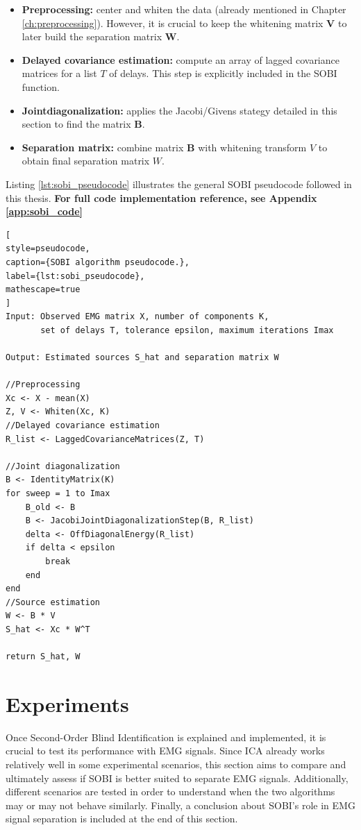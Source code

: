 \begin{itemize}
    \item \textbf{Preprocessing:} center and whiten the data (already mentioned in Chapter \ref{ch:preprocessing}). However, it is crucial to keep the whitening matrix $\mathbf{V}$ to later build the separation matrix $\mathbf{W}$.\item \textbf{Delayed covariance estimation:} compute an array of lagged covariance matrices for a list $T$ of delays. This step is explicitly included in the SOBI function.
    \item \textbf{Jointdiagonalization:} applies the Jacobi/Givens stategy detailed in this section to find the matrix $\mathbf{B}$.
    \item \textbf{Separation matrix:} combine matrix $\mathbf{B}$ with whitening transform $V$ to obtain final separation matrix $W$.
\end{itemize}

\noindent Listing \ref{lst:sobi_pseudocode} illustrates the general SOBI pseudocode followed in this thesis. \textbf{For full code implementation reference, see Appendix \ref{app:sobi_code}}

\begin{lstlisting}[
style=pseudocode,
caption={SOBI algorithm pseudocode.},
label={lst:sobi_pseudocode},
mathescape=true
]
Input: Observed EMG matrix X, number of components K,
       set of delays T, tolerance epsilon, maximum iterations Imax

Output: Estimated sources S_hat and separation matrix W

//Preprocessing
Xc <- X - mean(X)
Z, V <- Whiten(Xc, K)
//Delayed covariance estimation
R_list <- LaggedCovarianceMatrices(Z, T)

//Joint diagonalization
B <- IdentityMatrix(K)
for sweep = 1 to Imax
    B_old <- B
    B <- JacobiJointDiagonalizationStep(B, R_list)
    delta <- OffDiagonalEnergy(R_list)
    if delta < epsilon
        break
    end
end
//Source estimation
W <- B * V
S_hat <- Xc * W^T

return S_hat, W
\end{lstlisting}

\section{Experiments}

Once Second-Order Blind Identification is explained and implemented, it is crucial to test its performance with EMG signals. Since ICA already works relatively well in some experimental scenarios, this section aims to compare and ultimately assess if SOBI is better suited to separate EMG signals. Additionally, different scenarios are tested in order to understand when the two algorithms may or may not behave similarly. Finally, a conclusion about SOBI's role in EMG signal separation is included at the end of this section.


